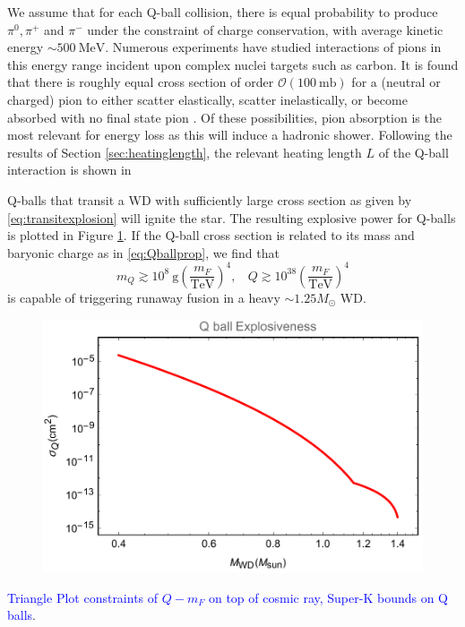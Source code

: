 \documentclass[twocolumn,showpacs,preprintnumbers,amsmath,amssymb,prd]{revtex4}
\newcommand{\OO}{\mathcal{O}}
\def\r{\right)}
\def\l{\left(}
\begin{document}
We assume that for each Q-ball collision, there is equal probability to produce $\pi^0, \pi^+$ and $\pi^-$ under the constraint of charge conservation, with average kinetic energy $\sim 500 ~\text{MeV}$. Numerous experiments have studied interactions of pions in this energy range incident upon complex nuclei targets such as carbon. It is found that there is roughly equal cross section of order $\OO (100 ~\text{mb})$ for a (neutral or charged) pion to either scatter elastically, scatter inelastically, or become absorbed with no final state pion \cite{Pionnuclear}. Of these possibilities, pion absorption is the most relevant for energy loss as this will induce a hadronic shower. Following the results of Section \ref{sec:heatinglength}, the relevant heating length $L$ of the Q-ball interaction is shown in 

Q-balls that transit a WD with sufficiently large cross section as given by \eqref{eq:transitexplosion} will ignite the star. The resulting explosive power for Q-balls is plotted in Figure \ref{fig:boomQball}. If the Q-ball cross section is related to its mass and baryonic charge as in \eqref{eq:Qballprop}, we find that
\begin{equation}
m_Q \gtrsim 10^8 ~\text{g} \l\frac{m_F}{\text{TeV}}\r^4, ~~~~ Q \gtrsim 10^{38} \l\frac{m_F}{\text{TeV}}\r^4
\end{equation}
is capable of triggering runaway fusion in a heavy $\sim 1.25 M_{\odot}$ WD.

\begin{figure}
\label{fig:boomQball}
\includegraphics[scale=.45]{boomQball.pdf}
\end{figure}

\textcolor{blue}{Triangle Plot constraints of $Q - m_F$ on top of cosmic ray, Super-K bounds on Q balls}.
\end{document}
